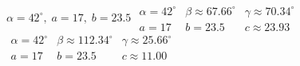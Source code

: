 { $\alpha = 42^{\circ}, \; a = 17, \; b = 23.5$}
{$\begin{array}{lll}\alpha = 42^{\circ} & \beta \approx 67.66^{\circ} & \gamma \approx 70.34^{\circ} \\a = 17 & b = 23.5 & c \approx 23.93 \end{array}$\\$\begin{array}{lll}\alpha = 42^{\circ} & \beta \approx 112.34^{\circ} & \gamma \approx 25.66^{\circ} \\a = 17 & b = 23.5 & c \approx 11.00 \end{array}$}
